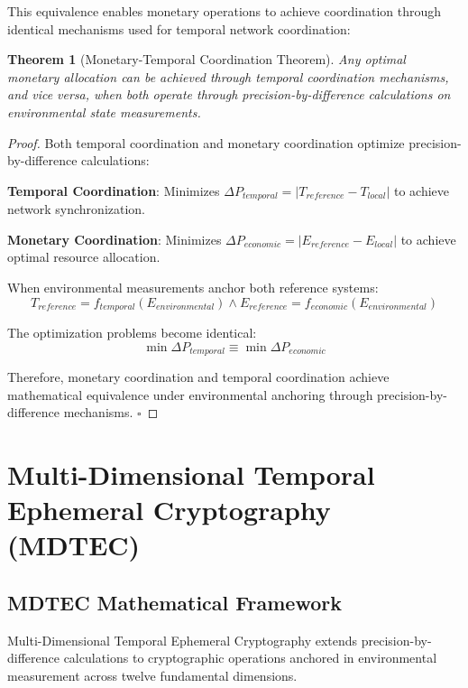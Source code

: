 \documentclass[12pt,a4paper]{article}
\newtheorem{theorem}{Theorem}
\begin{document}
This equivalence enables monetary operations to achieve coordination through identical mechanisms used for temporal network coordination:

\begin{theorem}[Monetary-Temporal Coordination Theorem]
Any optimal monetary allocation can be achieved through temporal coordination mechanisms, and vice versa, when both operate through precision-by-difference calculations on environmental state measurements.
\end{theorem}

\begin{proof}
Both temporal coordination and monetary coordination optimize precision-by-difference calculations:

\textbf{Temporal Coordination}: Minimizes $\Delta P_{temporal} = |T_{reference} - T_{local}|$ to achieve network synchronization.

\textbf{Monetary Coordination}: Minimizes $\Delta P_{economic} = |E_{reference} - E_{local}|$ to achieve optimal resource allocation.

When environmental measurements anchor both reference systems:
\begin{equation}
T_{reference} = f_{temporal}(E_{environmental}) \land E_{reference} = f_{economic}(E_{environmental})
\end{equation}

The optimization problems become identical:
\begin{equation}
\min \Delta P_{temporal} \equiv \min \Delta P_{economic}
\end{equation}

Therefore, monetary coordination and temporal coordination achieve mathematical equivalence under environmental anchoring through precision-by-difference mechanisms. $\square$
\end{proof}

\section{Multi-Dimensional Temporal Ephemeral Cryptography (MDTEC)}

\subsection{MDTEC Mathematical Framework}

Multi-Dimensional Temporal Ephemeral Cryptography extends precision-by-difference calculations to cryptographic operations anchored in environmental measurement across twelve fundamental dimensions.
\end{document}
